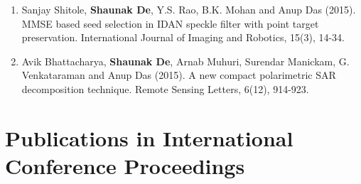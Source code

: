 \documentclass[12pt, a4paper]{article}
\begin{document}
{\begin{enumerate}
\item Sanjay Shitole, \textbf{Shaunak De}, Y.S. Rao, B.K. Mohan and Anup Das (2015). MMSE based seed selection in IDAN speckle filter with point target preservation. International Journal of Imaging and Robotics, 15(3), 14-34.

\item Avik Bhattacharya, \textbf{Shaunak De}, Arnab Muhuri, Surendar Manickam, G. Venkataraman and Anup Das (2015). A new compact polarimetric SAR decomposition technique. Remote Sensing Letters, 6(12), 914-923.

\end{enumerate}
}
\section*{Publications in International Conference Proceedings}
\end{document}

